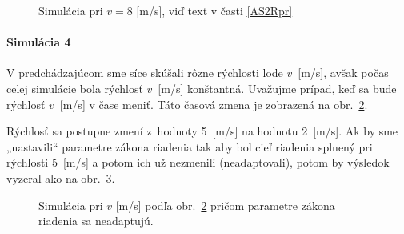 \documentclass[a4paper, 10pt, ]{article}
\begin{document}
\begin{figure}[t]
	\centering



	\caption{Simulácia pri $v = 8$ [m/s], viď text v časti \ref{AS2Rpr}}
	\label{fig_tex_03_5}

\end{figure}












\begin{figure}[!b]
	\centering

	\vspace{-2mm}


	\caption{}
	\label{figsc_ar04_fig_as2r_v_10}

	\vspace{-2mm}

\end{figure}



\paragraph{Simulácia 4}

V predchádzajúcom sme síce skúšali rôzne rýchlosti lode $v$~[m/s], avšak počas celej simulácie bola rýchlosť $v$~[m/s] konštantná. Uvažujme prípad, keď sa bude rýchlosť $v$~[m/s] v čase meniť. Táto časová zmena je zobrazená na obr.~\ref{figsc_ar04_fig_as2r_v_10}.

Rýchlosť sa postupne zmení z~hodnoty 5~[m/s] na hodnotu 2~[m/s]. Ak by sme „nastavili“ parametre zákona riadenia tak aby bol cieľ riadenia splnený pri rýchlosti 5~[m/s] a potom ich už nezmenili (neadaptovali), potom by výsledok vyzeral ako na obr.~\ref{figsc_ar04_fig_as2r_yu_67}.




\begin{figure}[t]
	\centering



	\caption{Simulácia pri $v$ [m/s] podľa obr.~\ref{figsc_ar04_fig_as2r_v_10} pričom parametre zákona riadenia sa neadaptujú.}
	\label{figsc_ar04_fig_as2r_yu_67}

\end{figure}
\end{document}

